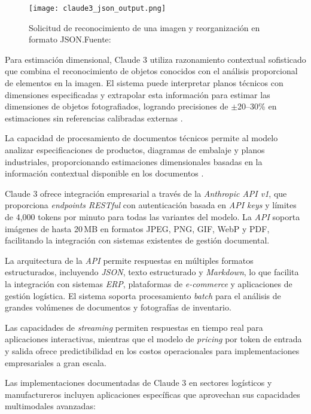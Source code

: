 \begin{figure}[H]
    \centering
    \texttt{[image: claude3\_json\_output.png]}
    \caption{Solicitud de reconocimiento de una imagen y reorganización en formato JSON.Fuente: \cite{Anthropic2024}}
    \label{fig:claude3_json}
\end{figure}

Para estimación dimensional, Claude 3 utiliza razonamiento contextual sofisticado que combina el reconocimiento de objetos conocidos con el análisis proporcional de elementos en la imagen. El sistema puede interpretar planos técnicos con dimensiones especificadas y extrapolar esta información para estimar las dimensiones de objetos fotografiados, logrando precisiones de $\pm$20--30\% en estimaciones sin referencias calibradas externas \cite{WebRef13251}.

La capacidad de procesamiento de documentos técnicos permite al modelo analizar especificaciones de productos, diagramas de embalaje y planos industriales, proporcionando estimaciones dimensionales basadas en la información contextual disponible en los documentos \cite{Anthropic2024}.

Claude 3 ofrece integración empresarial a través de la \textit{Anthropic API v1}, que proporciona \textit{endpoints RESTful} con autenticación basada en \textit{API keys} y límites de 4{,}000 tokens por minuto para todas las variantes del modelo. La \textit{API} soporta imágenes de hasta 20\,MB en formatos JPEG, PNG, GIF, WebP y PDF, facilitando la integración con sistemas existentes de gestión documental.

La arquitectura de la \textit{API} permite respuestas en múltiples formatos estructurados, incluyendo \textit{JSON}, texto estructurado y \textit{Markdown}, lo que facilita la integración con sistemas \textit{ERP}, plataformas de \textit{e-commerce} y aplicaciones de gestión logística. El sistema soporta procesamiento \textit{batch} para el análisis de grandes volúmenes de documentos y fotografías de inventario.

Las capacidades de \textit{streaming} permiten respuestas en tiempo real para aplicaciones interactivas, mientras que el modelo de \textit{pricing} por token de entrada y salida ofrece predictibilidad en los costos operacionales para implementaciones empresariales a gran escala.

Las implementaciones documentadas de Claude 3 en sectores logísticos y manufactureros incluyen aplicaciones específicas que aprovechan sus capacidades multimodales avanzadas:

